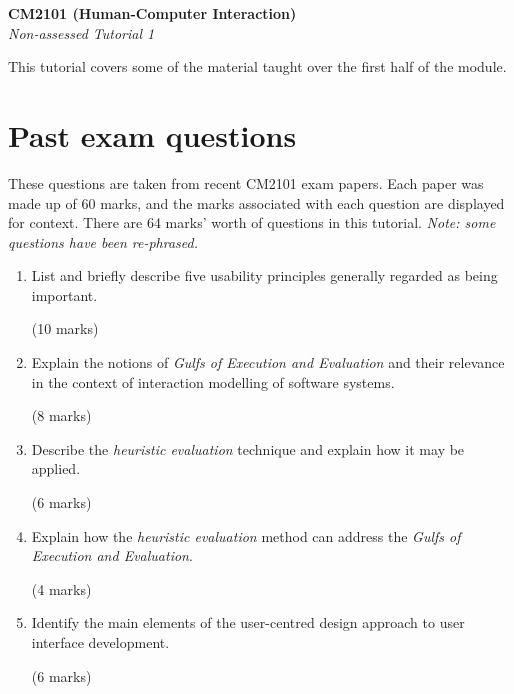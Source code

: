 \documentclass[11pt,a4paper]{report}
\begin{document}
\noindent\Large\textbf{CM2101 (Human-Computer Interaction)}\\
\noindent\large\textit{Non-assessed Tutorial 1}
\vskip30pt

\noindent This tutorial covers some of the material taught over the first half of the module. 

\section*{Past exam questions}
These questions are taken from recent CM2101 exam papers. Each paper was made up of 60 marks, and the marks associated with each question are displayed for context. There are 64 marks' worth of questions in this tutorial. \textit{Note: some questions have been re-phrased.}

\begin{enumerate}

\item List and briefly describe five usability principles generally regarded as being important.\\
    \begin{flushright}(10 marks)\end{flushright}

\item Explain the notions of \textit{Gulfs of Execution and Evaluation} and their relevance in the context of interaction modelling of software systems.\\
    \begin{flushright}(8 marks)\end{flushright}

\item Describe the \textit{heuristic evaluation} technique and explain how it may be applied.\\
    \begin{flushright}(6 marks)\end{flushright}

\item Explain how the \textit{heuristic evaluation} method can address the \textit{Gulfs of Execution and Evaluation}.\\
    \begin{flushright}(4 marks)\end{flushright}

\item Identify the main elements of the user-centred design approach to user interface development.\\
    \begin{flushright}(6 marks)\end{flushright}


\end{enumerate}
\end{document}
